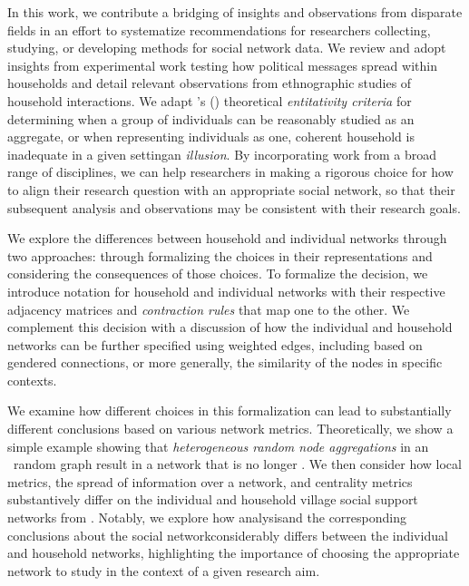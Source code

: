 In this work, we contribute a bridging of insights and observations from disparate fields in an effort to systematize recommendations for researchers collecting, studying, or developing methods for social network data. We review and adopt insights from experimental work testing how political messages spread within households and detail relevant observations from ethnographic studies of household interactions. We adapt \citeauthor{campbell1958common}'s (\citeyear{campbell1958common}) theoretical \textit{entitativity criteria} for determining when a group of individuals can be reasonably studied as an aggregate, or when representing individuals as one, coherent household is inadequate in a given setting\textemdash an \textit{illusion}. By incorporating work from a broad range of disciplines, we can help researchers in making a rigorous choice for how to align their research question with an appropriate social network, so that their subsequent analysis and observations may be consistent with their research goals.

We explore the differences between household and individual networks through two approaches: through formalizing the choices in their representations and considering the consequences of those choices. To formalize the decision, we introduce notation for household and individual networks with their respective adjacency matrices and \textit{contraction rules} that map one to the other. We complement this decision with a discussion of how the individual and household networks can be further specified using weighted edges, including based on gendered connections, or more generally, the similarity of the nodes in specific contexts. 

We examine how different choices in this formalization can lead to substantially different conclusions based on various network metrics. Theoretically, we show a simple example showing that \textit{heterogeneous random node aggregations} in an \ER~random graph result in a network that is no longer \ER. We then consider how local metrics, the spread of information over a  network, and centrality metrics substantively differ on the individual and household village social support networks from \cite{banerjee2013}. Notably, we explore how analysis\textemdash and the corresponding conclusions about the social network\textemdash considerably differs between the individual and household networks, highlighting the importance of choosing the appropriate network to study in the context of a given research aim.

